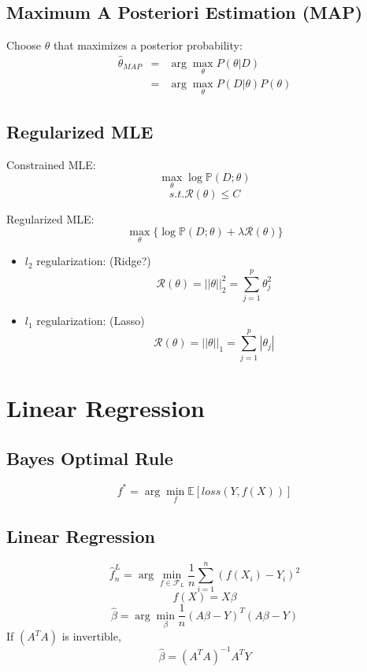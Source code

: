 \documentclass[letterpaper, 10pt, twocolumn]{article}
\begin{document}
\subsection{Maximum A Posteriori Estimation (MAP)}

Choose $\theta$ that maximizes a posterior probability:
\begin{equation}
\begin{array}{rcl}
\hat{\theta}_{MAP} & = & \arg\max_{\theta} P(\theta|D) \\
				   & = & \arg\max_{\theta} P(D|\theta)P(\theta)
\end{array}
\end{equation}

\subsection{Regularized MLE}

Constrained MLE:
$$\max_{\theta}\log\mathbb{P}(D;\theta)$$
$$s.t. \mathcal{R}(\theta) \leq C$$

Regularized MLE:
$$\max_{\theta} \{\log\mathbb{P}(D;\theta)+\lambda\mathcal{R}(\theta)\}$$

\begin{itemize}
	\item $l_2$ regularization: (Ridge?)
	$$\mathcal{R}(\theta) = ||\theta||_2^2 = \sum_{j=1}^{p}\theta_j^2$$
	\item $l_1$ regularization: (Lasso)
	$$\mathcal{R}(\theta) = ||\theta||_1 = \sum_{j=1}^{p}|\theta_j|$$
\end{itemize}

\newpage

\section{Linear Regression}

\subsection{Bayes Optimal Rule}

$$f^* = \arg\min_f \mathbb{E}[loss(Y,f(X))]$$

\subsection{Linear Regression}

$$\hat{f}_n^L = \arg\min_{f\in \mathcal{F}_L} \frac{1}{n}\sum\limits_{i=1}^{n}(f(X_i)-Y_i)^2$$
$$f(X) = X\beta$$
$$\hat{\beta} = \arg\min_{\beta}\frac{1}{n}(A\beta-Y)^T(A\beta-Y)$$
If $(A^TA)$ is invertible,
$$\hat{\beta} = (A^TA)^{-1}A^TY$$
\end{document}
